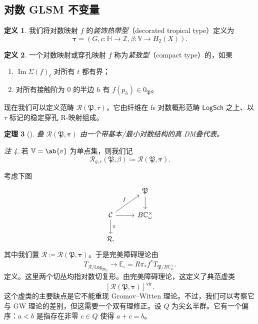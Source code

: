 \documentclass{amsart}
\newtheorem{thm}{定理}[section]
\theoremstyle{definition}
\newtheorem{defn}[thm]{定义}
\theoremstyle{remark}
\newtheorem{rmk}[thm]{注}
\theoremstyle{plain}
\theoremstyle{definition}
\theoremstyle{remark}
\DeclareMathOperator{\Ima}{Im}
\newcommand{\C}{\mathbb{C}}
\newcommand{\Z}{\mathbb{Z}}
\newcommand{\E}{\mathbb{E}}
\newcommand{\V}{\mathbb{V}}
\renewcommand{\H}{\mathbb{H}}
\newcommand{\mc}[1]{\mathcal{#1}}
\newcommand{\mf}[1]{\mathfrak{#1}}
\newcommand{\mr}[1]{\mathrm{#1}}
\newcommand{\ms}[1]{\mathsf{#1}}
\newcommand{\1}{\mathbf{1}}
\newcommand{\2}{\mathbf{2}}
\newcommand{\3}{\mathbf{3}}
\newcommand{\vir}{\mr{vir}}
\begin{document}
\subsection{对数 GLSM 不变量}%
\label{sub:Log GLSM invariants}

\begin{defn}
    我们将对数映射 \(f\) 的\textit{装饰热带型}（decorated tropical type）定义为
    \[ \bm{\tau} = (G, c \colon \H \to \Z, \beta \colon \V \to H_2(X)). \]
\end{defn}

\begin{defn}
    一个对数映射或穿孔映射 \(f\) 称为\textit{紧致型}（compact type）的，如果
    \begin{enumerate}
        \item \(\Ima \Sigma(f)_t\) 对所有 \(t\) 都有界；
        \item 对所有接触阶为 \(0\) 的半边 \(h\) 有 \(f(p_h) \in 0_{\mf{P}}\)。
    \end{enumerate}
\end{defn}

现在我们可以定义范畴 \(\mc{R}(\mf{P}, \tau)\)，它由纤维在 fs 对数概形范畴 \(\ms{LogSch}\) 之上、以 \(\tau\) 标记的稳定穿孔 R-映射组成。

\begin{thm}[{\cite{CJR2021,CJRpunctured}}]
    叠 \(\mc{R}(\mf{P},\bm{\tau})\) 由一个带基本/最小对数结构的真 DM叠代表。
\end{thm}

\begin{rmk}
    若 \(\V = \ab\{v\}\) 为单点集，则我们记
    \[ \mc{R}_{g, c}(\mf{P}, \beta) \coloneqq \mc{R}(\mf{P}, \bm{\tau}). \]
\end{rmk}

考虑下图
\begin{equation*}
\begin{tikzcd}
    & \mf{P} \ar{d} \\
    \mc{C} \ar{ur}{f} \ar{d}{\pi} \ar{r} & B \C_{\omega}^{\times} \\
    \mc{R},
\end{tikzcd}
\end{equation*}
其中我们置 \(\mc{R} \coloneqq \mc{R}(\mf{P}, \bm{\tau})\)。于是完美障碍理论由
\[ T_{\mc{R}/\ms{Log}_{\mf{M}_G}} \to \E_{\square} = R \pi_* f^* T_{\mf{P}/B\C_{\omega}^{\times}}. \]
定义。这里两个切丛均指对数切复形。由完美障碍理论，这定义了典范虚类
\[ [\mc{R}(\mf{P}, \bm{\tau})]^{\vir}. \]
这个虚类的主要缺点是它不能重现 Gromov–Witten 理论。不过，我们可以考察它与 GW 理论的差别，但这需要一个双有理修正。设 \(Q\) 为尖幺半群。它有一个偏序：\(a < b\) 是指存在非零 \(c \in Q\) 使得 \(a+c = b\)。
\end{document}
